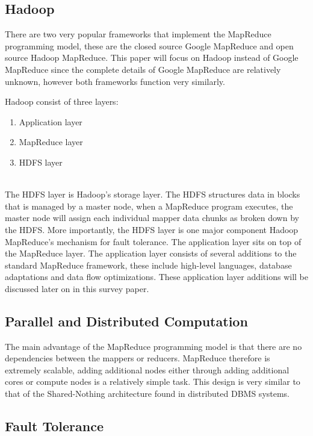 \documentclass[10pt,twocolumn]{IEEEtran11}
\begin{document}
\subsection{Hadoop}
There are two very popular frameworks that implement the MapReduce programming model, these are the closed source Google MapReduce and open source Hadoop MapReduce.  
This paper will focus on Hadoop instead of Google MapReduce since the complete details of Google MapReduce are relatively unknown, however both frameworks function very similarly.
\par
Hadoop consist of three layers:
\  \\
\begin{enumerate}
	\setlength\itemsep{1em}
	\item Application layer
	\item MapReduce layer
	\item HDFS layer
\end{enumerate} 
\  \\
The HDFS layer is Hadoop's storage layer.  The HDFS structures data in blocks that is managed by a master node, when a MapReduce program executes, the master node will assign each individual mapper data chunks as broken down by the HDFS.  More importantly, the HDFS layer is one major component Hadoop MapReduce's mechanism for
fault tolerance.  The application layer sits on top of the MapReduce layer.  The application layer consists of several additions to the standard MapReduce framework, these include high-level languages, database adaptations and data flow optimizations.  These application layer additions will be discussed later on in this survey paper.

\subsection{Parallel and Distributed Computation}

The main advantage of the MapReduce programming model is that there are no dependencies between the mappers or reducers.  MapReduce therefore is extremely scalable, adding additional nodes either through adding additional cores or compute nodes is a relatively simple task.  This design is very similar to that of the Shared-Nothing architecture found in distributed DBMS systems.

\subsection{Fault Tolerance}
\end{document}

